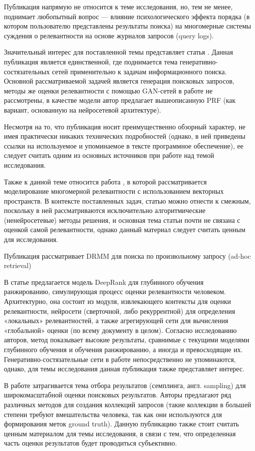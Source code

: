 Публикация \cite{DBLP:journals/corr/abs-1807-05355} напрямую не относится к теме исследования, но, тем не менее, поднимает
любопытный вопрос — влияние психологического эффекта порядка (в котором пользователю представлены результаты поиска)
на многомерные системы суждения о релевантности на основе журналов запросов (query logs).

Значительный интерес для поставленной темы представляет статья \cite{DBLP:journals/corr/abs-1806-03577}. Данная публикация
является единственной, где поднимается тема генеративно-состязательных сетей применительно к задачам информационного поиска.
Основной рассматриваемой задачей является генерация поисковых запросов, методы же оценки релевантности с помощью GAN-сетей
в работе не рассмотрены, в качестве модели автор предлагает вышеописанную PRF (как вариант, основанную на нейросетевой
архитектуре).

Несмотря на то, что публикация \cite{DBLP:journals/corr/abs-1806-03577} носит преимущественно обзорный характер, не имея
практически никаких технических подробностей (однако, в ней приведены ссылки на используемое и упоминаемое в тексте
программное обеспечение), ее следует считать одним из основных источников при работе над темой исследования.

Также к данной теме относится работа \cite{DBLP:journals/corr/abs-1805-02184}, в которой рассматривается моделирование
многомерной релевантности с использованием векторных пространств. В контексте поставленных задач, статью можно отнести
к смежным, поскольку в ней рассматриваются исключительно алгоритмические (ненейросетевые) методы решения, и основная тема
статьи почти не связана с оценкой самой релевантности, однако данный материал следует считать ценным для исследования.

Публикация \cite{DBLP:journals/corr/abs-1711-08611} рассматривает DRMM для поиска по произвольному запросу (ad-hoc retrieval)

В статье \cite{DBLP:journals/corr/abs-1710-05649} предлагается модель DeepRank для глубинного обучения ранжированию,
симулирующая процесс оценки релевантности человеком. Архитектурно, она состоит из модуля, извлекающего контексты для оценки
релевантности, нейросети (сверточной, либо рекуррентной) для определения «локальных» релевантностей, а также агрегирующей
сети для вычисления «глобальной» оценки (по всему документу в целом). Согласно исследованию авторов, метод показывает высокие
результаты, сравнимые с текущими моделями глубинного обучения и обучения ранжированию, а иногда и превосходящие их.
Генеративно-состязательные сети в работе непосредственно не упоминаются, однако, для темы исследования данная публикация
также представляет интерес.

В работе \cite{DBLP:journals/corr/abs-1709-01709} затрагивается тема отбора результатов (семплинга, англ. sampling)
для широкомасштабной оценки поисковых результатов. Авторы предлагают ряд различных методов для создания коллекций запросов
(такие коллекции в большей степени требуют вмешательства человека, так как они используются для формирования меток
ground truth). Данную публикацию также стоит считать ценным материалом для темы исследования, в связи с тем,
что определенная часть оценки результатов будет проводиться субъективно.